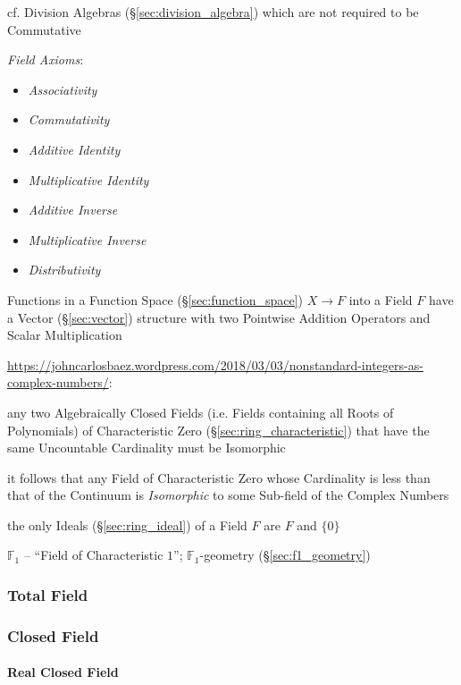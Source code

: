 cf. Division Algebras (\S\ref{sec:division_algebra}) which are not required to
be Commutative

\emph{Field Axioms}:
\begin{itemize}
  \item \emph{Associativity}
  \item \emph{Commutativity}
  \item \emph{Additive Identity}
  \item \emph{Multiplicative Identity}
  \item \emph{Additive Inverse}
  \item \emph{Multiplicative Inverse}
  \item \emph{Distributivity}
\end{itemize}

Functions in a Function Space (\S\ref{sec:function_space}) $X
\rightarrow F$ into a Field $F$ have a Vector (\S\ref{sec:vector})
structure with two Pointwise Addition Operators and Scalar
Multiplication

\url{https://johncarlosbaez.wordpress.com/2018/03/03/nonstandard-integers-as-complex-numbers/}:

any two Algebraically Closed Fields (i.e. Fields containing all Roots of
Polynomials) of Characteristic Zero (\S\ref{sec:ring_characteristic}) that have
the same Uncountable Cardinality must be Isomorphic

it follows that any Field of Characteristic Zero whose Cardinality is less than
that of the Continuum is \emph{Isomorphic} to some Sub-field of the Complex
Numbers

the only Ideals (\S\ref{sec:ring_ideal}) of a Field $F$ are $F$ and $\{0\}$

\fist $\mathbb{F}_1$ -- ``Field of Characteristic $1$''; $\mathbb{F}_1$-geometry
(\S\ref{sec:f1_geometry})



\subsubsection{Total Field}\label{sec:total_field}

\subsubsection{Closed Field}\label{sec:closed_field}

\paragraph{Real Closed Field}\label{sec:real_closed}\hfill

